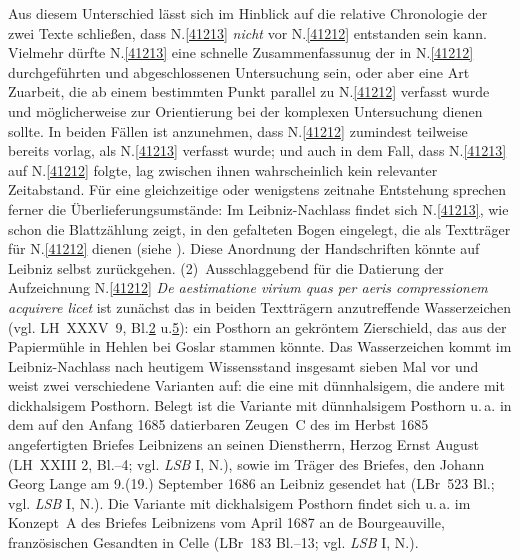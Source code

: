 Aus diesem Unterschied lässt sich im Hinblick auf die relative Chronologie der zwei Texte schließen, dass N.\;\ref{41213} \textit{nicht} vor N.\;\ref{41212} entstanden sein kann.
Vielmehr dürfte N.\;\ref{41213} eine schnelle Zusammenfassunug der in N.\;\ref{41212} durchgeführten und abgeschlossenen Untersuchung sein, oder aber eine Art Zuarbeit, die ab einem bestimmten Punkt parallel zu N.\;\ref{41212} verfasst wurde und möglicherweise zur Orientierung bei der komplexen Untersuchung dienen sollte.
In beiden Fällen ist anzunehmen, dass N.\;\ref{41212} zumindest teilweise bereits vorlag, als N.\;\ref{41213} verfasst wurde; und auch in dem Fall, dass N.\;\ref{41213} auf N.\;\ref{41212} folgte, lag zwischen ihnen wahrscheinlich kein relevanter Zeitabstand.
Für eine gleichzeitige oder wenigstens zeitnahe Entstehung sprechen 
ferner die Überlieferungsumstände:
Im Leibniz-Nachlass findet sich N.\;\ref{41213}, wie schon die Blattzählung zeigt, in den gefalteten Bogen eingelegt, die als Textträger für N.\;\ref{41212} dienen (siehe ).
Diese Anordnung der Handschriften könnte auf Leibniz selbst zurückgehen.
\pend%
\pstart%
(2)~Ausschlaggebend für die Datierung der Aufzeichnung N.\;\ref{41212} \textit{De aestimatione virium quas per aeris compressionem acquirere licet} ist zunächst das in beiden Textträgern anzutreffende Wasserzeichen (vgl. LH~XXXV~9, Bl.\;\href{\Scan{LH_35_09_25_002wz}}{2} u.\;\href{\Scan{LH_35_09_25_005wz}}{5}): ein Posthorn an gekröntem Zierschield, das aus der Papiermühle in Hehlen bei Goslar stammen könnte. %
Das Wasserzeichen kommt im Leibniz-Nachlass nach heutigem Wissensstand insgesamt sieben Mal vor und weist zwei verschiedene Varianten auf: die eine mit dünnhalsigem, die andere mit dickhalsigem Posthorn.
Belegt ist die Variante mit dünnhalsigem Posthorn u.\,a. in dem auf den Anfang 1685 datierbaren Zeugen~C des im Herbst 1685 angefertigten Briefes Leibnizens an seinen Dienstherrn, Herzog Ernst August (LH~XXIII 2, Bl.--4; vgl. \textit{LSB} I, N.),\cite{01404} sowie im Träger des Briefes, den Johann Georg Lange am 9.\;(19.) September 1686 an Leibniz gesendet hat (LBr~523 Bl.; vgl. \textit{LSB} I, N.).\cite{01410}
Die Variante mit dickhalsigem Posthorn findet sich u.\,a. im Konzept~A des Briefes Leibnizens vom April 1687 an de Bourgeauville, französischen Gesandten in Celle (LBr~183 Bl.--13; vgl. \textit{LSB} I, N.).\cite{01405}
